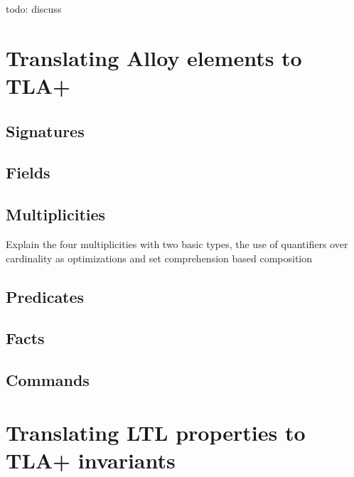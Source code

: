 todo: discuss

\section{Translating Alloy elements to TLA+}

\subsection{Signatures}


\subsection{Fields}

\subsection{Multiplicities}

Explain the four multiplicities with two basic types, the use of quantifiers over cardinality as optimizations and set comprehension based composition

\subsection{Predicates}

\subsection{Facts}

\subsection{Commands}


\section{Translating LTL properties to TLA+ invariants}
